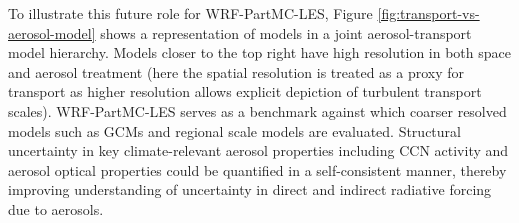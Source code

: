 To illustrate this future role for WRF-PartMC-LES, Figure \ref{fig:transport-vs-aerosol-model} shows a representation of models in a joint aerosol-transport model hierarchy. Models closer to the top right have high resolution in both space and aerosol treatment (here the spatial resolution is treated as a proxy for transport as higher resolution allows explicit depiction of turbulent transport scales). WRF-PartMC-LES serves as a benchmark against which coarser resolved models such as GCMs and regional scale models are evaluated. Structural uncertainty in key climate-relevant aerosol properties including CCN activity and aerosol optical properties could be quantified in a self-consistent manner, thereby improving understanding of uncertainty in direct and indirect radiative forcing due to aerosols.   


